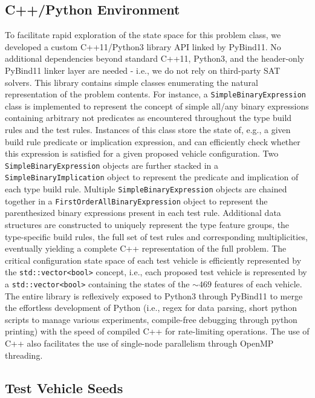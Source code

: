 \documentclass[aps,pra,twocolumn,superscriptaddress,groupedaddress]{revtex4}  %
\begin{document}
\subsection{C++/Python Environment}

To facilitate rapid exploration of the state space for this problem class, we
developed a custom C++11/Python3 library API linked by PyBind11. No additional
dependencies beyond standard C++11, Python3, and the header-only PyBind11 linker
layer are needed - i.e., we do not rely on third-party SAT solvers. This library
contains simple classes enumerating the natural representation of the problem
contents. For instance, a \texttt{SimpleBinaryExpression} class is implemented
to represent the concept of simple all/any binary expressions containing
arbitrary not predicates as encountered throughout the type build rules and the
test rules. Instances of this class store the state of, e.g., a given build rule
predicate or implication expression, and can efficiently check whether this
expression is satisfied for a given proposed vehicle configuration. Two
\texttt{SimpleBinaryExpression} objects are further stacked in a
\texttt{SimpleBinaryImplication} object to represent the predicate and
implication of each type build rule. Multiple \texttt{SimpleBinaryExpression}
objects are chained together in a \texttt{FirstOrderAllBinaryExpression} object
to represent the parenthesized binary expressions present in each test rule.
Additional data structures are constructed to uniquely represent the type
feature groups, the type-specific build rules, the full set of test rules and
corresponding multiplicities, eventually yielding a complete C++ representation
of the full problem. The critical configuration state space of each test vehicle
is efficiently represented by the \texttt{std::vector<bool>} concept, i.e., each
proposed test vehicle is represented by a \texttt{std::vector<bool>} containing the
states of the $\sim 469$ features of each vehicle.
 The entire library is reflexively exposed to Python3 through PyBind11 to merge
the effortless development of Python (i.e., regex for data parsing, short python
scripts to manage various experiments, compile-free debugging through python
printing) with the speed of compiled C++ for rate-limiting operations. The use
of C++ also facilitates the use of single-node parallelism through OpenMP
threading.

\subsection{Test Vehicle Seeds}
\end{document}
